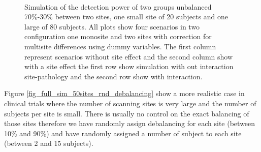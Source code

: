 \documentclass[authoryear]{elsarticle}
\begin{document}
\begin{figure}[t]
     \\
     \tiny Simulation of the detection power of two groups unbalanced 70\%-30\% between two sites, one small site of 20 subjects and one large of 80 subjects. All plots show four scenarios in two configuration one monosite and two sites with correction for multisite differences using dummy variables. The first column represent scenarios without site effect and the second column show with a site effect the first row show simulation with out interaction site-pathology and the second row show with interaction.
     \label{fig_full_sim_2sites_debalancing_inv}
 \end{figure}
 
Figure \ref{fig_full_sim_50sites_rnd_debalancing} show a more realistic case in clinical trials where the number of scanning sites is very large and the number of subjects per site is small. There is usually no control on the exact balancing of those sites therefore we have randomly assign debalancing for each site (between 10\% and 90\%) and have randomly assigned a number of subject to each site (between 2 and 15 subjects).
\end{document}
